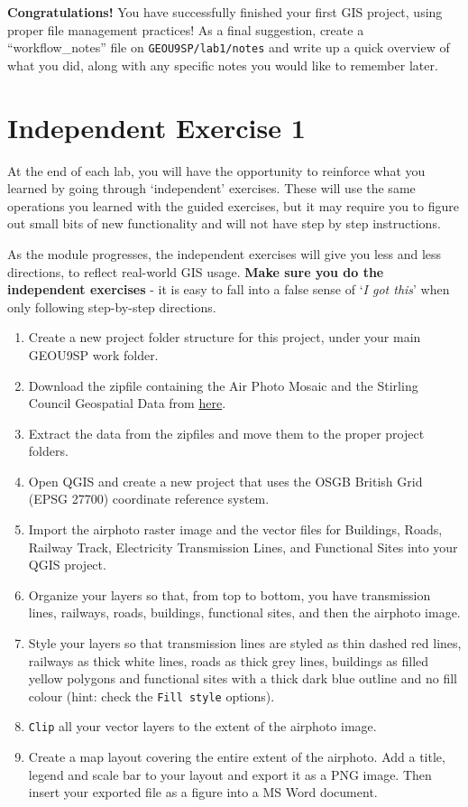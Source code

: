 \documentclass[
  letterpaper,
  DIV=11,
  numbers=noendperiod]{scrreprt}
\begin{document}
\textbf{Congratulations!} You have successfully finished your first GIS
project, using proper file management practices! As a final suggestion,
create a ``workflow\_notes'' file on \texttt{GEOU9SP/lab1/notes} and
write up a quick overview of what you did, along with any specific notes
you would like to remember later.

\section{Independent Exercise 1}\label{independent-exercise-1}

At the end of each lab, you will have the opportunity to reinforce what
you learned by going through `independent' exercises. These will use the
same operations you learned with the guided exercises, but it may
require you to figure out small bits of new functionality and will not
have step by step instructions.

As the module progresses, the independent exercises will give you less
and less directions, to reflect real-world GIS usage. \textbf{Make sure
you do the independent exercises} - it is easy to fall into a false
sense of `\emph{I got this}' when only following step-by-step
directions.

\begin{enumerate}
\def\labelenumi{\arabic{enumi}.}
\item
  Create a new project folder structure for this project, under your
  main GEOU9SP work folder.
\item
  Download the zipfile containing the Air Photo Mosaic and the Stirling
  Council Geospatial Data from
  \href{https://stir-my.sharepoint.com/:u:/g/personal/ala2_stir_ac_uk/EWxq18uE5uRAjh_fGHf1qC4BRKxp-M4QTs0e1qttSa_m_Q?e=oPnFWQ}{here}.
\item
  Extract the data from the zipfiles and move them to the proper project
  folders.
\item
  Open QGIS and create a new project that uses the OSGB British Grid
  (EPSG 27700) coordinate reference system.
\item
  Import the airphoto raster image and the vector files for Buildings,
  Roads, Railway Track, Electricity Transmission Lines, and Functional
  Sites into your QGIS project.
\item
  Organize your layers so that, from top to bottom, you have
  transmission lines, railways, roads, buildings, functional sites, and
  then the airphoto image.
\item
  Style your layers so that transmission lines are styled as thin dashed
  red lines, railways as thick white lines, roads as thick grey lines,
  buildings as filled yellow polygons and functional sites with a thick
  dark blue outline and no fill colour (hint: check the
  \texttt{Fill\ style} options).
\item
  \texttt{Clip} all your vector layers to the extent of the airphoto
  image.
\item
  Create a map layout covering the entire extent of the airphoto. Add a
  title, legend and scale bar to your layout and export it as a PNG
  image. Then insert your exported file as a figure into a MS Word
  document.
\end{enumerate}
\end{document}
